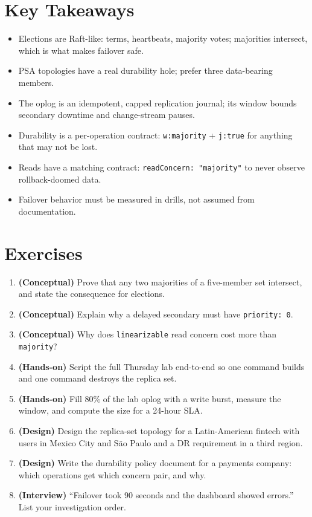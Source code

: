 \section*{Key Takeaways}
\begin{itemize}
    \item Elections are Raft-like: terms, heartbeats, majority votes; majorities intersect, which is what makes failover safe.
    \item PSA topologies have a real durability hole; prefer three data-bearing members.
    \item The oplog is an idempotent, capped replication journal; its window bounds secondary downtime and change-stream pauses.
    \item Durability is a per-operation contract: \texttt{w:majority} + \texttt{j:true} for anything that may not be lost.
    \item Reads have a matching contract: \texttt{readConcern: "majority"} to never observe rollback-doomed data.
    \item Failover behavior must be measured in drills, not assumed from documentation.
\end{itemize}

\section{Exercises}
\begin{enumerate}
    \item \textbf{(Conceptual)} Prove that any two majorities of a five-member set intersect, and state the consequence for elections.
    \item \textbf{(Conceptual)} Explain why a delayed secondary must have \texttt{priority: 0}.
    \item \textbf{(Conceptual)} Why does \texttt{linearizable} read concern cost more than \texttt{majority}?
    \item \textbf{(Hands-on)} Script the full Thursday lab end-to-end so one command builds and one command destroys the replica set.
    \item \textbf{(Hands-on)} Fill 80\% of the lab oplog with a write burst, measure the window, and compute the size for a 24-hour SLA.
    \item \textbf{(Design)} Design the replica-set topology for a Latin-American fintech with users in Mexico City and S\~ao Paulo and a DR requirement in a third region.
    \item \textbf{(Design)} Write the durability policy document for a payments company: which operations get which concern pair, and why.
    \item \textbf{(Interview)} ``Failover took 90 seconds and the dashboard showed errors.'' List your investigation order.
\end{enumerate}

